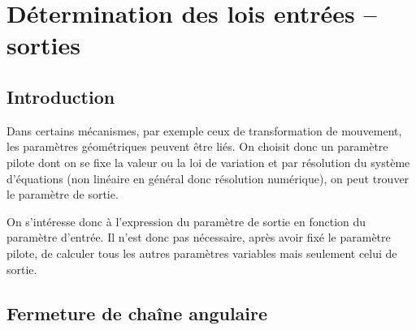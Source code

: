 \documentclass[10pt,oneside]{article}
\begin{document}
\section{Détermination des lois entrées -- sorties}
\subsection{Introduction}

Dans certains mécanismes, par exemple ceux de transformation de mouvement, les paramètres géométriques peuvent être liés. On choisit donc un paramètre pilote dont on se fixe la valeur ou la loi de variation et par résolution du système d'équations (non linéaire en général donc résolution numérique), on peut trouver le paramètre de sortie.

On s'intéresse donc à l'expression du paramètre de sortie en fonction du paramètre d'entrée. Il n'est donc pas nécessaire, après avoir fixé le paramètre pilote, de calculer tous les autres paramètres variables mais seulement celui de sortie.


\subsection{Fermeture de chaîne angulaire}
\end{document}
